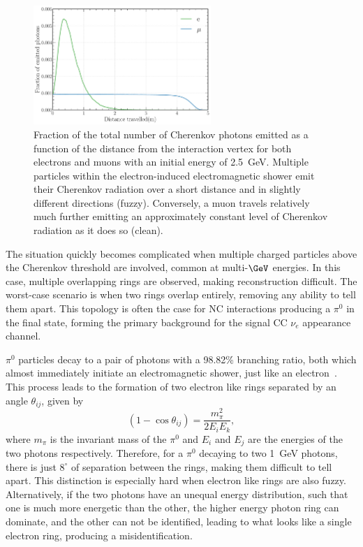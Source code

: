 \begin{figure} %
    \includegraphics[width=0.6\textwidth]{diagrams/4-chips/emission_distance.pdf}
    \caption[Fraction of Cherenkov photons emitted as a function of distance]
    {Fraction of the total number of Cherenkov photons emitted as a function of the distance from
        the interaction vertex for both electrons and muons with an initial energy of
        \SI{2.5}{\GeV}. Multiple particles within the electron-induced electromagnetic shower emit
        their Cherenkov radiation over a short distance and in slightly different directions
        (fuzzy). Conversely, a muon travels relatively much further emitting an approximately
        constant level of Cherenkov radiation as it does so (clean).}
    \label{fig:emission distance}
\end{figure}

The situation quickly becomes complicated when multiple charged particles above the Cherenkov
threshold are involved, common at multi-$\GeV$ energies. In this case, multiple overlapping rings
are observed, making reconstruction difficult. The worst-case scenario is when two rings overlap
entirely, removing any ability to tell them apart. This topology is often the case for NC
interactions producing a $\pi^{0}$ in the final state, forming the primary background for the
signal CC $\nu_{e}$ appearance channel.

$\pi^{0}$ particles decay to a pair of photons with a 98.82\% branching ratio, both which almost
immediately initiate an electromagnetic shower, just like an electron~\cite{particle2020}. This
process leads to the formation of two electron like rings separated by an angle $\theta_{ij}$,
given by
\begin{equation}
    (1-\cos\theta_{ij})=\frac{m_{\pi}^2}{2E_{i}E_{k}},
\end{equation}
where $m_{\pi}$ is the invariant mass of the $\pi^{0}$ and $E_{i}$ and $E_{j}$ are the energies of
the two photons respectively. Therefore, for a $\pi^{0}$ decaying to two \SI{1}{\GeV} photons,
there is just $8^{\circ}$ of separation between the rings, making them difficult to tell apart.
This distinction is especially hard when electron like rings are also fuzzy. Alternatively, if the
two photons have an unequal energy distribution, such that one is much more energetic than the
other, the higher energy photon ring can dominate, and the other can not be identified, leading to
what looks like a single electron ring, producing a misidentification.

